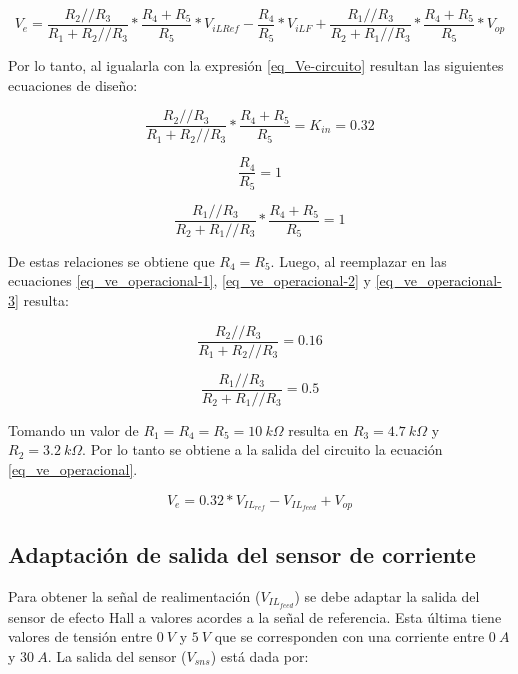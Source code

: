 \begin{equation*}
	V_e = \frac{R_{2}//R_{3}}{R_{1}+R_{2}//R_{3}}*\frac{R_{4}+R_{5}}{R_{5}}*V_{iLRef}-\frac{R_{4}}{R_{5}}*V_{iLF}+\frac{R_{1}//R_{3}}{R_{2}+R_{1}//R_{3}}*\frac{R_{4}+R_{5}}{R_{5}}* V_{op}
\end{equation*}

Por lo tanto, al igualarla con la expresión \ref{eq_Ve-circuito} resultan las siguientes ecuaciones de diseño:

\begin{equation} \label{eq_ve_operacional-1}
	\frac{R_{2}//R_{3}}{R_{1}+R_{2}//R_{3}}*\frac{R_{4}+R_{5}}{R_{5}} = K_{in} = 0.32
\end{equation}

\begin{equation} \label{eq_ve_operacional-2}
	\frac{R_{4}}{R_{5}} = 1
\end{equation}

\begin{equation} \label{eq_ve_operacional-3}
	\frac{R_{1}//R_{3}}{R_{2}+R_{1}//R_{3}}*\frac{R_{4}+R_{5}}{R_{5}} = 1
\end{equation}

De estas relaciones se obtiene que $R_{4}=R_{5}$. Luego, al reemplazar en las ecuaciones \ref{eq_ve_operacional-1}, \ref{eq_ve_operacional-2} y \ref{eq_ve_operacional-3} resulta:

\begin{equation*}
	\frac{R_{2}//R_{3}}{R_{1}+R_{2}//R_{3}}= 0.16
\end{equation*}

\begin{equation*}
	\frac{R_{1}//R_{3}}{R_{2}+R_{1}//R_{3}}= 0.5
\end{equation*}

Tomando un valor de $R_{1} = R_{4} =R_5= 10\:k\Omega$ resulta en $R_{3}=4.7\:k\Omega$ y $R_{2}=3.2\:k\Omega$. Por lo tanto se obtiene a la salida del circuito la ecuación \ref{eq_ve_operacional}.

\begin{equation} \label{eq_ve_operacional}
	V_e = 0.32 * V_{IL_{ref}} - V_{IL_{feed}} + V_{op}
\end{equation}


\subsection{Adaptación de salida del sensor de corriente}

Para obtener la señal de realimentación ($V_{IL_{feed}}$) se debe adaptar la salida del sensor de efecto Hall a valores acordes a la señal de referencia. Esta última tiene valores de tensión entre $0\:V$ y $5\:V$ que se corresponden con una corriente entre $0\:A$ y $30\:A$. La salida del sensor ($V_{sns}$) está dada por:


